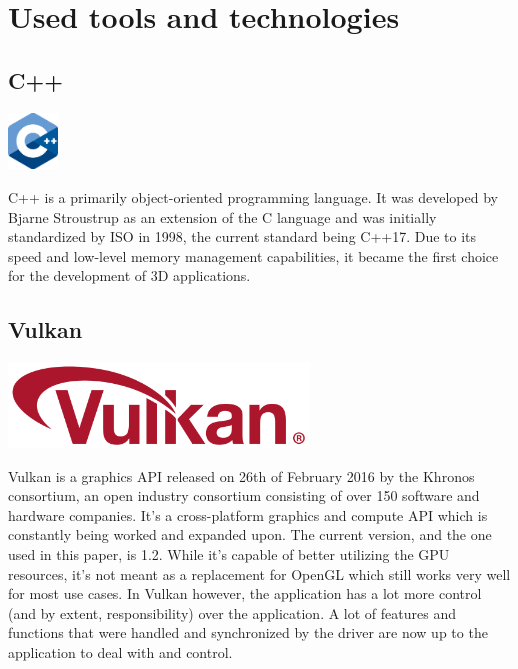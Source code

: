\documentclass[times, utf8, zavrsni, numeric]{fer}
\begin{document}
\chapter{Used tools and technologies}
\section{C++}

\begin{center}
\includegraphics[width=0.1\textwidth]{cpp_logo.png}
\end{center}

C++ is a primarily object-oriented programming language. It was developed by Bjarne Stroustrup as an extension of the C language and was initially standardized by ISO in 1998, the current standard being C++17. Due to its speed and low-level memory management capabilities, it became the first choice for the development of 3D applications.

\section{Vulkan}

\begin{center}
\includegraphics[width=0.6\textwidth]{vulkan_logo.png}
\end{center}

Vulkan \cite{vulkan_spec} is a graphics API released on 26th of February 2016 by the Khronos consortium, an open industry consortium consisting of over 150 software and hardware companies. It's a cross-platform graphics and compute API which is constantly being worked and expanded upon. The current version, and the one used in this paper, is 1.2. While it’s capable of better utilizing the GPU resources, it’s not meant as a replacement for OpenGL which still works very well for most use cases. In Vulkan however, the application has a lot more control (and by extent, responsibility) over the application. A lot of features and functions that were handled and synchronized by the driver are now up to the application to deal with and control.
\end{document}
